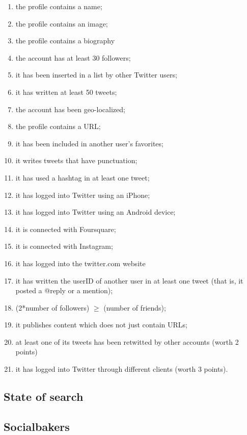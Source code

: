 \documentclass[a4paper,11pt]{article}
\begin{document}
\begin{multicols}{2}
\begin{enumerate}
\item the profile contains a name;
\item the profile contains an image;
\item the profile contains a biography
\item the account has at least 30 followers;
\item it has been inserted in a  list by other Twitter users;
\item it has written at least 50 tweets;
\item the account has been geo-localized;
\item the profile contains a URL;
\item it has been included in another user's favorites;
\item it writes tweets that have punctuation;
\item it has used a hashtag in at least one tweet;
\item it has logged into Twitter using an iPhone;
\item it has logged into Twitter using an Android device;
\item it is connected with Foursquare;
\item it is connected with Instagram;
\item it has logged into the twitter.com website
\item it has written the userID of another user in at least one tweet (that is, it posted a @reply or a mention);
\item (2*number of followers) $\geq$ (number of friends);
\item it publishes content which does not just contain URLs;
\item at least one of its tweets has been retwitted by other accounts (worth 2 points)
\item it has logged into Twitter through different clients (worth 3 points).
\end{enumerate}
\end{multicols}

\subsection{State of search}


\subsection{Socialbakers}
\end{document}
